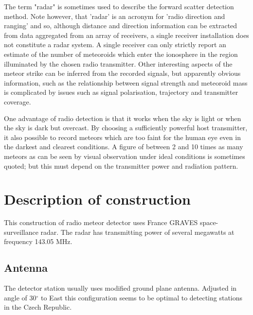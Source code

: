 \documentclass[12pt,a4paper,oneside]{article}
\begin{document}
     The term "radar" is sometimes used to describe the forward scatter detection method.  Note however, that 'radar' is an acronym for 'radio direction and ranging' and so, although distance and direction information can be extracted from data aggregated from an array of receivers, a single receiver installation does not constitute a radar system.  A single receiver can only strictly report an estimate of the number of meteoroids which enter the ionosphere in the region illuminated by the chosen radio transmitter.  Other interesting aspects of the meteor strike can be inferred from the recorded signals, but apparently obvious information, such as the relationship between signal strength and meteoroid mass is complicated by issues such as signal polarisation, trajectory and transmitter coverage. 
     
     One advantage of radio detection is that it works when the sky is light or when the sky is dark but overcast.  By choosing a sufficiently powerful host transmitter, it also possible to record meteors which are too faint for the human eye even in the darkest and clearest conditions.  A figure of between 2 and 10 times as many meteors as can be seen by visual observation under ideal conditions is sometimes quoted; but this must depend on the transmitter power and radiation pattern.

\section{Description of construction}

This construction of radio meteor detector uses France GRAVES space-surveillance radar. The radar has transmitting power of several megawatts at frequency 143.05 MHz.   

\subsection{Antenna}
The detector station usually uses  modified ground plane antenna. Adjusted in angle of 30$^\circ$ to East this configuration seems to be optimal to detecting stations in the Czech Republic. 
\end{document}
